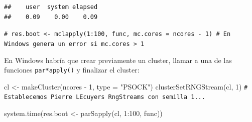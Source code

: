 \documentclass[
]{book}
\newenvironment{Shaded}{\begin{snugshade}}{\end{snugshade}}
\newcommand{\AttributeTok}[1]{\textcolor[rgb]{0.77,0.63,0.00}{#1}}
\newcommand{\CommentTok}[1]{\textcolor[rgb]{0.56,0.35,0.01}{\textit{#1}}}
\newcommand{\ConstantTok}[1]{\textcolor[rgb]{0.00,0.00,0.00}{#1}}
\newcommand{\ControlFlowTok}[1]{\textcolor[rgb]{0.13,0.29,0.53}{\textbf{#1}}}
\newcommand{\DecValTok}[1]{\textcolor[rgb]{0.00,0.00,0.81}{#1}}
\newcommand{\FunctionTok}[1]{\textcolor[rgb]{0.00,0.00,0.00}{#1}}
\newcommand{\NormalTok}[1]{#1}
\newcommand{\OtherTok}[1]{\textcolor[rgb]{0.56,0.35,0.01}{#1}}
\newcommand{\SpecialCharTok}[1]{\textcolor[rgb]{0.00,0.00,0.00}{#1}}
\newcommand{\StringTok}[1]{\textcolor[rgb]{0.31,0.60,0.02}{#1}}
\theoremstyle{break}
\theoremstyle{nonumberplain}
\renewcommand{\CommentTok}[1]{\textcolor[rgb]{0.41,0.41,0.41}{\texttt{#1}}}
\begin{document}
\begin{Shaded}
\end{Shaded}

\begin{verbatim}
##    user  system elapsed 
##    0.09    0.00    0.09
\end{verbatim}

\begin{Shaded}
\begin{Highlighting}[]
\CommentTok{\# res.boot \textless{}{-} mclapply(1:100, func, mc.cores = ncores {-} 1) \# En Windows genera un error si mc.cores \textgreater{} 1}
\end{Highlighting}
\end{Shaded}

En Windows habría que crear previamente un cluster, llamar a una de las funciones \texttt{par*apply()} y finalizar el cluster:

\begin{Shaded}
\begin{Highlighting}[]
\NormalTok{cl }\OtherTok{\textless{}{-}} \FunctionTok{makeCluster}\NormalTok{(ncores }\SpecialCharTok{{-}} \DecValTok{1}\NormalTok{, }\AttributeTok{type =} \StringTok{"PSOCK"}\NormalTok{)}
\FunctionTok{clusterSetRNGStream}\NormalTok{(cl, }\DecValTok{1}\NormalTok{) }\CommentTok{\# Establecemos Pierre L\textquotesingle{}Ecuyer\textquotesingle{}s RngStreams con semilla 1...}

\FunctionTok{system.time}\NormalTok{(res.boot }\OtherTok{\textless{}{-}} \FunctionTok{parSapply}\NormalTok{(cl, }\DecValTok{1}\SpecialCharTok{:}\DecValTok{100}\NormalTok{, func))}
\end{Highlighting}
\end{Shaded}
\end{document}

